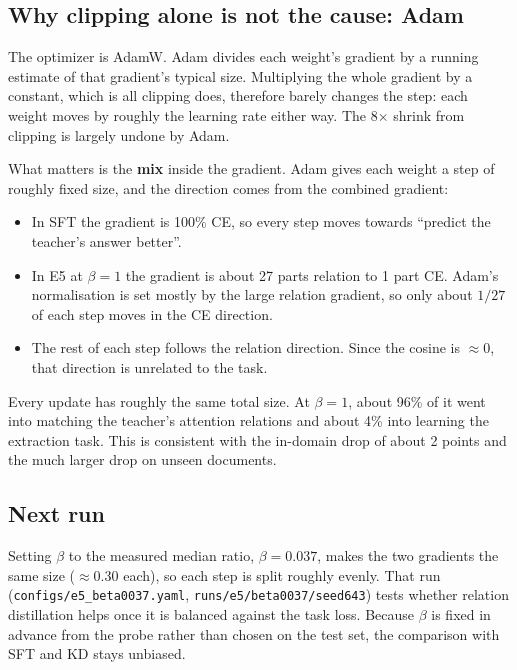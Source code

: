 \documentclass[10pt]{article}
\newcommand{\code}[1]{\texttt{#1}}
\begin{document}
\subsection*{Why clipping alone is not the cause: Adam}

The optimizer is AdamW. Adam divides each weight's gradient by a running estimate of that gradient's typical size. Multiplying the whole gradient by a constant, which is all clipping does, therefore barely changes the step: each weight moves by roughly the learning rate either way. The 8$\times$ shrink from clipping is largely undone by Adam.

What matters is the \textbf{mix} inside the gradient. Adam gives each weight a step of roughly fixed size, and the direction comes from the combined gradient:
\begin{itemize}
  \item In SFT the gradient is 100\% CE, so every step moves towards ``predict the teacher's answer better''.
  \item In E5 at $\beta = 1$ the gradient is about 27 parts relation to 1 part CE. Adam's normalisation is set mostly by the large relation gradient, so only about $1/27$ of each step moves in the CE direction.
  \item The rest of each step follows the relation direction. Since the cosine is $\approx 0$, that direction is unrelated to the task.
\end{itemize}

Every update has roughly the same total size. At $\beta = 1$, about 96\% of it went into matching the teacher's attention relations and about 4\% into learning the extraction task. This is consistent with the in-domain drop of about 2 points and the much larger drop on unseen documents.

\subsection*{Next run}

Setting $\beta$ to the measured median ratio, $\beta = 0.037$, makes the two gradients the same size ($\approx 0.30$ each), so each step is split roughly evenly. That run (\code{configs/e5\_beta0037.yaml}, \code{runs/e5/beta0037/seed643}) tests whether relation distillation helps once it is balanced against the task loss. Because $\beta$ is fixed in advance from the probe rather than chosen on the test set, the comparison with SFT and KD stays unbiased.
\end{document}
